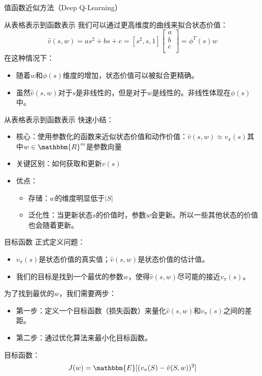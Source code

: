 \begin{section}{值函数近似方法\alert{（Deep Q-Learning）}}
\begin{frame}{从表格表示到函数表示}
   我们可以通过更高维度的曲线来拟合状态价值：
   \[
        \hat{v}(s,w)=as^2+bs+c=[s^2,s,1]\begin{bmatrix}
            a \\
            b \\
            c \\
        \end{bmatrix}=\phi^T(s)w
   \]
   在这种情况下：
   \begin{itemize}
    \item 随着$w$和$\phi(s)$维度的增加，状态价值可以被拟合更精确。
    \item 虽然$\hat{v}(s,w)$对于$s$是非线性的，但是对于$w$是线性的。非线性体现在$\phi(s)$中。
   \end{itemize}
\end{frame}

\begin{frame}{从表格表示到函数表示}
    快速小结：
    \begin{itemize}
     \item 核心：使用\alert{参数化的函数}来近似状态价值和动作价值：$\hat{v}(s,w)\approx v_\pi(s)$其中$w\in \mathbbm{R}^m$是参数向量
     \item 关键区别：如何获取和更新$v(s)$
     \item 优点：
    \begin{itemize}
        \item 存储：$w$的维度明显低于$|S|$
        \item 泛化性：当更新状态$s$的价值时，参数$w$会更新。所以一些其他状态的价值也会随着更新。
    \end{itemize}
    \end{itemize}
\end{frame}

\begin{frame}{目标函数}
    正式定义问题：
    \begin{itemize}
        \item $v_\pi(s)$是状态价值的\alert{真实值}；$\hat{v}(s,w)$是状态价值的\alert{估计值}。
        \item 我们的目标是找到一个最优的参数$w$，使得$\hat{v}(s,w)$尽可能的接近$v_\pi(s)$。
    \end{itemize}
    为了找到最优的$w$，我们需要两步：
    \begin{itemize}
        \item 第一步：定义一个目标函数（损失函数）来量化$\hat{v}(s,w)$和$v_\pi(s)$之间的差距。
        \item 第二步：通过优化算法来最小化目标函数。
    \end{itemize}
    \alert{目标函数：
        \[
            J(w)=\mathbbm{E}[(v_\pi(S)-\hat{v}(S,w))^2]
        \]
    }
\end{frame}


\end{section}
